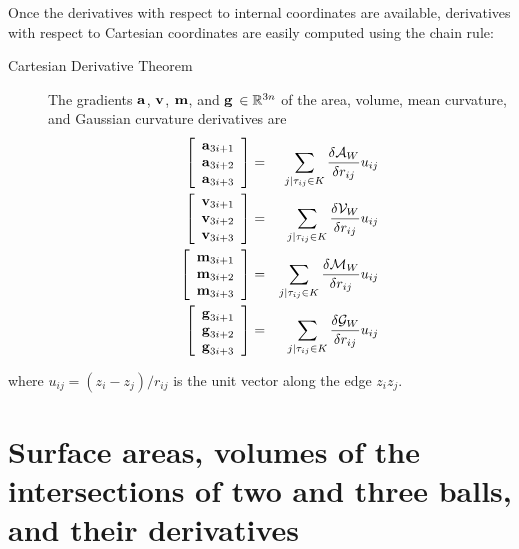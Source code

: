 \documentclass[11 pt]{article}
\newcommand {\mm}[1] {\ifmmode{#1}\else{\mbox{\(#1\)}}\fi}
\theoremstyle{plain} \theorembodyfont{\rmfamily}
\newcommand{\Rspace}        {\mm{{\mathbb R}}}
\newcommand{\AAA}           {\mm{\bf a}}
\newcommand{\VVV}           {\mm{\bf v}}
\newcommand{\MMM}           {\mm{\bf m}}
\newcommand{\GGG}           {\mm{\bf g}}
\begin{document}
 Once the derivatives with respect to internal coordinates are available, derivatives with respect to Cartesian coordinates are easily computed using the chain rule:
 \begin{description}
  \item[{\sc Cartesian Derivative Theorem}]
    The gradients  $\AAA$, $\VVV$, $\MMM$, and $\GGG$ $\in \Rspace^{3n}$ of the area, volume, mean curvature, and Gaussian curvature derivatives are
    \begin{eqnarray}
      \left[ \begin{array}{c}
               \AAA_{3i+1} \\ \AAA_{3i+2} \\ \AAA_{3i+3}
             \end{array} \right]
	&=&  \sum_{j \mid \tau_{ij} \in K} \frac{\delta \mathcal{A}_W}{\delta r_{ij}} u_{ij}  \nonumber \\
	\left[ \begin{array}{c}
               \VVV_{3i+1} \\ \VVV_{3i+2} \\ \VVV_{3i+3}
             \end{array} \right]
	&=&  \sum_{j \mid \tau_{ij} \in K} \frac{\delta \mathcal{V}_W}{\delta r_{ij}} u_{ij}  \nonumber \\
	\left[ \begin{array}{c}
               \MMM_{3i+1} \\ \MMM_{3i+2} \\ \MMM_{3i+3}
             \end{array} \right]
	&=&  \sum_{j \mid \tau_{ij} \in K} \frac{\delta \mathcal{M}_W}{\delta r_{ij}} u_{ij}  \nonumber \\
         \left[ \begin{array}{c}
               \GGG_{3i+1} \\ \GGG_{3i+2} \\ \GGG_{3i+3}
             \end{array} \right]
	&=&  \sum_{j \mid \tau_{ij} \in K} \frac{\delta \mathcal{G}_W}{\delta r_{ij}} u_{ij} 
	\label{eqn:deriv_cart}
      \end{eqnarray}
  \end{description}
  where $u_{ij} = (z_i-z_j)/r_{ij}$ is the unit vector along the edge $z_i z_j$.

\section{Surface areas, volumes of the intersections of two and three balls, and their derivatives}
\label{sec:threesphere}
\end{document}
